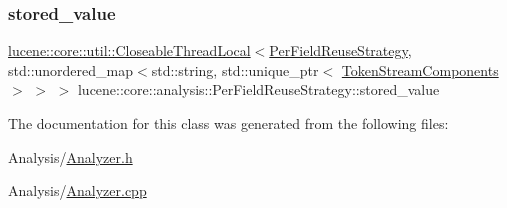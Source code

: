 \subsubsection{\texorpdfstring{stored\+\_\+value}{stored\_value}}
{\footnotesize\ttfamily \mbox{\hyperlink{classlucene_1_1core_1_1util_1_1CloseableThreadLocal}{lucene\+::core\+::util\+::\+Closeable\+Thread\+Local}}$<$\mbox{\hyperlink{classlucene_1_1core_1_1analysis_1_1PerFieldReuseStrategy}{Per\+Field\+Reuse\+Strategy}}, std\+::unordered\+\_\+map$<$std\+::string, std\+::unique\+\_\+ptr$<$ \mbox{\hyperlink{classlucene_1_1core_1_1analysis_1_1TokenStreamComponents}{Token\+Stream\+Components}}$>$ $>$ $>$ lucene\+::core\+::analysis\+::\+Per\+Field\+Reuse\+Strategy\+::stored\+\_\+value\hspace{0.3cm}{\ttfamily [private]}}



The documentation for this class was generated from the following files\+:\begin{DoxyCompactItemize}
\item 
Analysis/\mbox{\hyperlink{Analyzer_8h}{Analyzer.\+h}}\item 
Analysis/\mbox{\hyperlink{Analyzer_8cpp}{Analyzer.\+cpp}}\end{DoxyCompactItemize}

